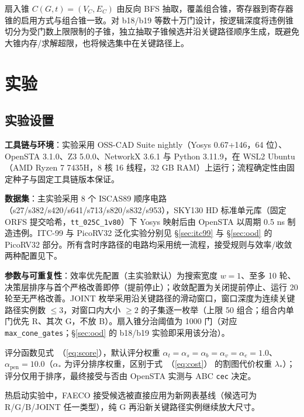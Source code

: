 \documentclass[journal]{IEEEtran}
\renewcommand{\eqref}[1]{\textup{（\ref{#1}）}}
\begin{document}
扇入锥 $C(G, t) = (V_C, E_C)$ 由反向 BFS 抽取，覆盖组合锥，寄存器到寄存器锥的启用方式与组合锥一致。对 b18/b19 等数十万门设计，按逻辑深度将违例锥切分为受门数上限限制的子锥，独立抽取子锥候选并沿关键路径顺序生成，既避免大锥内存/求解超限，也将候选集中在关键路径上。

\section{实验}\label{sec:exp}

\subsection{实验设置}\label{sec:setup}

\textbf{工具链与环境}：实验采用 OSS-CAD Suite nightly（Yosys 0.67+146，64 位）、OpenSTA 3.1.0、Z3 5.0.0、NetworkX 3.6.1 与 Python 3.11.9，在 WSL2 Ubuntu（AMD Ryzen 7 7435H，8 核 16 线程，32 GB RAM）上运行；流程确定性由固定种子与固定工具链版本保证。

\textbf{数据集}：主实验采用 8 个 ISCAS89 顺序电路（s27/s382/s420/s641/s713/s820/s832/s953），SKY130 HD 标准单元库（固定 ORFS 提交哈希，\texttt{tt\_025C\_1v80}）下 Yosys 映射后由 OpenSTA 以周期 0.5 ns 制造违例。ITC-99 与 PicoRV32 泛化实验分别见 \S\ref{sec:itc99} 与 \S\ref{sec:ood} 的 PicoRV32 部分。所有含时序路径的电路均采用统一流程，接受规则与效率/收敛两种配置见下。

\textbf{参数与可重复性}：效率优先配置（主实验默认）为搜索宽度 $w=1$、至多 10 轮、决策层排序与首个严格改善即停（提前停止）；收敛配置为关闭提前停止、运行 20 轮至无严格改善。JOINT 枚举采用沿关键路径的滑动窗口，窗口深度为连续关键路径实例数 $\le 3$，对窗口内大小 $\ge 2$ 的子集逐一枚举（上限 50 组合；组合内单门优先 R、其次 G，不放 B）。扇入锥分治阈值为 1000 门（对应 \texttt{max\_cone\_gates}；\S\ref{sec:ood} 的 b18/b19 实验即采用该分治）。

评分函数见式~\eqref{eq:score}，默认评分权重 $\alpha_t=\alpha_s=\alpha_b=\alpha_v=\alpha_e=1.0$、$\alpha_{\mathrm{pen}}=10.0$（$\alpha_*$ 为评分排序权重，区别于式~\eqref{eq:cost} 的割图代价权重 $\lambda_*$）；评分仅用于排序，最终接受与否由 OpenSTA 实测与 ABC \texttt{cec} 决定。

热启动实验中，FAECO 接受候选被直接应用为新网表基线（候选可为 R/G/B/JOINT 任一类型），纯 G 再沿新关键路径实例继续放大尺寸。
\end{document}
